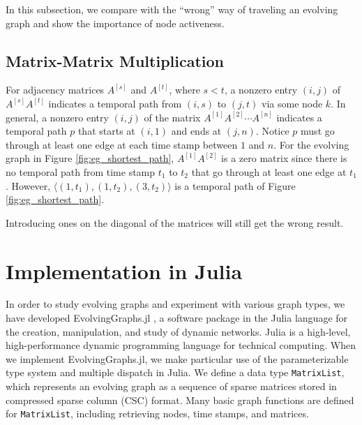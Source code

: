 \documentclass[11pt,conference,compsocconf]{IEEEtran}
\theoremstyle{definition}
\begin{document}
In this subsection, we compare with the ``wrong'' way of traveling an evolving graph
and show the importance of node activeness.


\subsection{Matrix-Matrix Multiplication}
\label{sec:matr-matr-mult-1}

For adjacency matrices $A^{[s]}$ and $A^{[t]}$, where $s < t$, a nonzero entry
$(i,j)$ of $A^{[s]} A^{[t]}$ indicates a temporal path from $(i,s)$ to $(j,t)$ via
some node $k$.
In general, a nonzero entry $(i,j)$ of the matrix $A^{[1]}A^{[2]}\cdots A^{[n]}$
indicates a temporal path $p$ that starts at $(i,1)$ and ends at  $(j,n)$.
Notice $p$ must go through at least one edge at each time stamp between $1$ and $n$.
For the evolving graph in Figure \ref{fig:eg_shortest_path}, $A^{[1]}A^{[2]}$
is a zero matrix since there is no temporal path from time stamp $t_1$ to $t_2$ that
go through at least one edge at $t_1$. However,
$\langle(1, t_1), (1, t_2), (3,t_2)\rangle$ is a temporal path of Figure \ref{fig:eg_shortest_path}.

Introducing ones on the diagonal of the matrices will still get the wrong result.


\section{Implementation in Julia}
\label{sec:implementation-julia}

In order to study evolving graphs and experiment with various graph types, we have developed EvolvingGraphs.jl  \cite{zhang15}, a software package in the Julia language \cite{bkse12} for the creation, manipulation, and study of dynamic networks.
Julia is a high-level, high-performance dynamic programming language for technical
computing. When we implement EvolvingGraphs.jl, we make particular use of
the parameterizable type system and multiple dispatch in Julia.
We define a data type  \texttt{MatrixList}, which represents an evolving graph
as a sequence of sparse matrices stored in compressed sparse column (CSC) format.
Many basic graph functions are defined for \texttt{MatrixList}, including
retrieving nodes, time stamps, and matrices.
\end{document}
